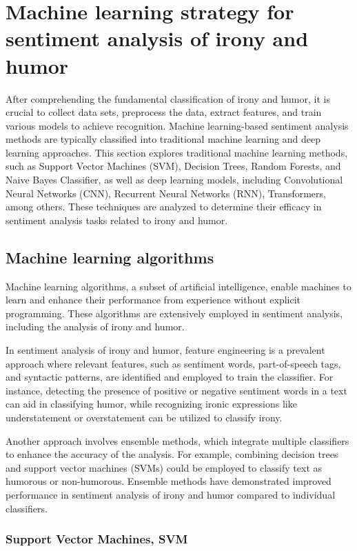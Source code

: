 \documentclass[a4paper]{article}
\begin{document}
\section{Machine learning strategy for sentiment analysis of irony and humor}

After comprehending the fundamental classification of irony and humor, it is crucial to collect data sets, preprocess the data, extract features, and train various models to achieve recognition. Machine learning-based sentiment analysis methods are typically classified into traditional machine learning and deep learning approaches. This section explores traditional machine learning methods, such as Support Vector Machines (SVM), Decision Trees, Random Forests, and Naive Bayes Classifier, as well as deep learning models, including Convolutional Neural Networks (CNN), Recurrent Neural Networks (RNN), Transformers, among others. These techniques are analyzed to determine their efficacy in sentiment analysis tasks related to irony and humor.

\subsection{Machine learning algorithms}

Machine learning algorithms, a subset of artificial intelligence, enable machines to learn and enhance their performance from experience without explicit programming. These algorithms are extensively employed in sentiment analysis, including the analysis of irony and humor.

In sentiment analysis of irony and humor, feature engineering is a prevalent approach where relevant features, such as sentiment words, part-of-speech tags, and syntactic patterns, are identified and employed to train the classifier. For instance, detecting the presence of positive or negative sentiment words in a text can aid in classifying humor, while recognizing ironic expressions like understatement or overstatement can be utilized to classify irony.

Another approach involves ensemble methods, which integrate multiple classifiers to enhance the accuracy of the analysis. For example, combining decision trees and support vector machines (SVMs) could be employed to classify text as humorous or non-humorous. Ensemble methods have demonstrated improved performance in sentiment analysis of irony and humor compared to individual classifiers.

\subsubsection{Support Vector Machines, SVM}
\end{document}
